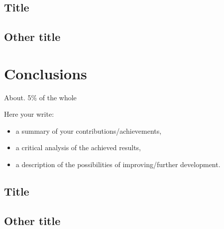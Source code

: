 \documentclass[12pt,a4paper,twoside]{report}
\begin{document}
\section{Title}
\section{Other title}

\chapter{Conclusions}

About. 5\% of the whole

Here your write:
\begin{itemize}
\item a summary of your contributions/achievements,
\item a critical analysis of the achieved results,
\item a description of the possibilities of improving/further development.
\end{itemize}
\section{Title}
\section{Other title}


 


\end{document}
